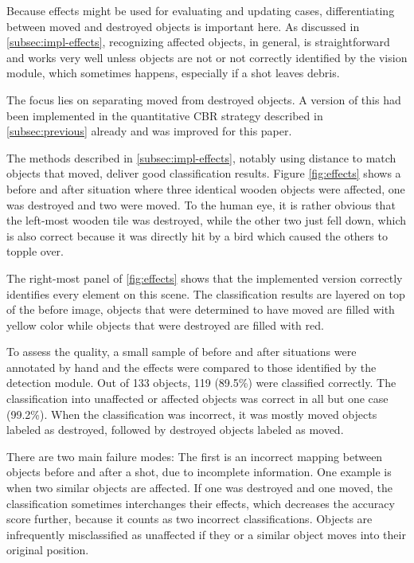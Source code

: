 Because effects might be used for evaluating and updating cases, differentiating between moved and destroyed objects is important here.
As discussed in \ref{subsec:impl-effects}, recognizing affected objects, in general, is straightforward and works very well unless objects are not or not correctly identified by the vision module, which sometimes happens, especially if a shot leaves debris.

The focus lies on separating moved from destroyed objects.
A version of this had been implemented in the quantitative \ac{CBR} strategy described in \ref{subsec:previous} already and was improved for this paper.

The methods described in \ref{subsec:impl-effects}, notably using distance to match objects that moved, deliver good classification results. Figure \ref{fig:effects} shows a before and after situation where three identical wooden objects were affected, one was destroyed and two were moved.
To the human eye, it is rather obvious that the left-most wooden tile was destroyed, while the other two just fell down, which is also correct because it was directly hit by a bird which caused the others to topple over.

The right-most panel of \ref{fig:effects} shows that the implemented version correctly identifies every element on this scene.
The classification results are layered on top of the before image, objects that were determined to have moved are filled with yellow color while objects that were destroyed are filled with red.

To assess the quality, a small sample of before and after situations were annotated by hand and the effects were compared to those identified by the detection module. Out of 133 objects, 119 (89.5\%) were classified correctly. The classification into unaffected or affected objects was correct in all but one case (99.2\%).
When the classification was incorrect, it was mostly moved objects labeled as destroyed, followed by destroyed objects labeled as moved.

There are two main failure modes: The first is an incorrect mapping between objects before and after a shot, due to incomplete information. One example is when two similar objects are affected. If one was destroyed and one moved, the classification sometimes interchanges their effects, which decreases the accuracy score further, because it counts as two incorrect classifications.
Objects are infrequently misclassified as unaffected if they or a similar object moves into their original position.

